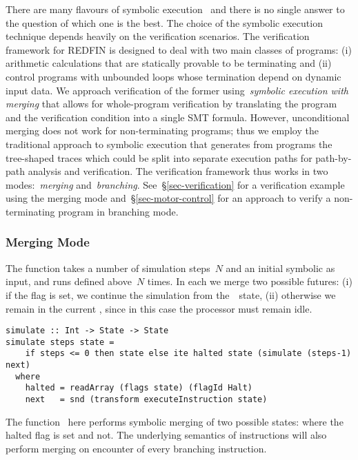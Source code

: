 There are many flavours of symbolic execution~\cite{SurveySymExec-CSUR18}
and there is no single answer to the question of which one is the best.
The choice of the symbolic execution technique depends heavily on the
verification scenarios. The verification framework for REDFIN is designed
to deal with two main classes of programs: (i) arithmetic calculations that
are statically provable to be terminating and (ii) control programs with
unbounded loops whose termination depend on dynamic input data. We approach
verification of the former using~\emph{symbolic execution with merging} that
allows for whole-program verification by translating the program and the
verification condition into a single SMT formula. However, unconditional merging
does not work for non-terminating programs; thus
we employ the traditional approach to symbolic execution that generates from programs
the tree-shaped traces which could be split into separate execution paths for path-by-path
analysis and verification. The verification framework thus works in two
modes:~\emph{merging} and~\emph{branching}. See~\S\ref{sec-verification} for
a verification example using the merging mode and~\S\ref{sec-motor-control} for
an approach to verify a non-terminating program in branching mode.

\subsubsection{Merging Mode}

The function  takes a number of simulation steps~$N$ and an initial
symbolic  as input, and runs  defined above~$N$
times. In each  we merge two possible futures: (i) if the 
flag is set, we continue the simulation from the~~state, (ii) otherwise
we remain in the current , since in this case the processor must
remain idle.

\vspace{1mm}
\begin{verbatim}
simulate :: Int -> State -> State
simulate steps state =
    if steps <= 0 then state else ite halted state (simulate (steps-1) next)
  where
    halted = readArray (flags state) (flagId Halt)
    next   = snd (transform executeInstruction state)
\end{verbatim}
\vspace{1mm}

\noindent
The function~ here performs symbolic merging of two possible states:
where the halted flag is set and not. The underlying semantics of instructions
will also perform merging on encounter of every branching instruction.

